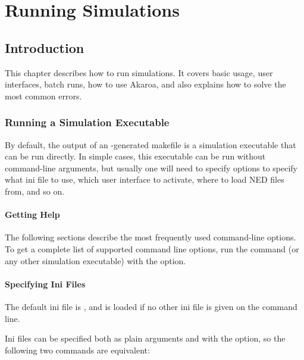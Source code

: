 \chapter{Running Simulations}
\label{cha:run-sim}

\section{Introduction}
\label{sec:run-sim:introduction}

This chapter describes how to run simulations. It covers basic usage,
user interfaces, batch runs, how to use Akaroa, and also explains
how to solve the most common errors.

\subsection{Running a Simulation Executable}
\label{sec:run-sim:running}

By default, the output of an -generated makefile is
a simulation executable that can be run directly. In simple cases,
this executable can be run without command-line arguments, but usually
one will need to specify options to specify what ini file to use,
which user interface to activate, where to load NED files from, and so on.

\subsubsection{Getting Help}
\label{sec:run-sim:getting-help}

The following sections describe the most frequently used command-line
options. To get a complete list of supported command line options, run
the  command (or any other simulation executable) with
the  option.


\subsubsection{Specifying Ini Files}
\label{sec:run-sim:specifying-ini-files}

The default ini file is , and is
loaded if no other ini file is given on the command line.

Ini files can be specified both as plain arguments and with the 
option, so the following two commands are equivalent:

